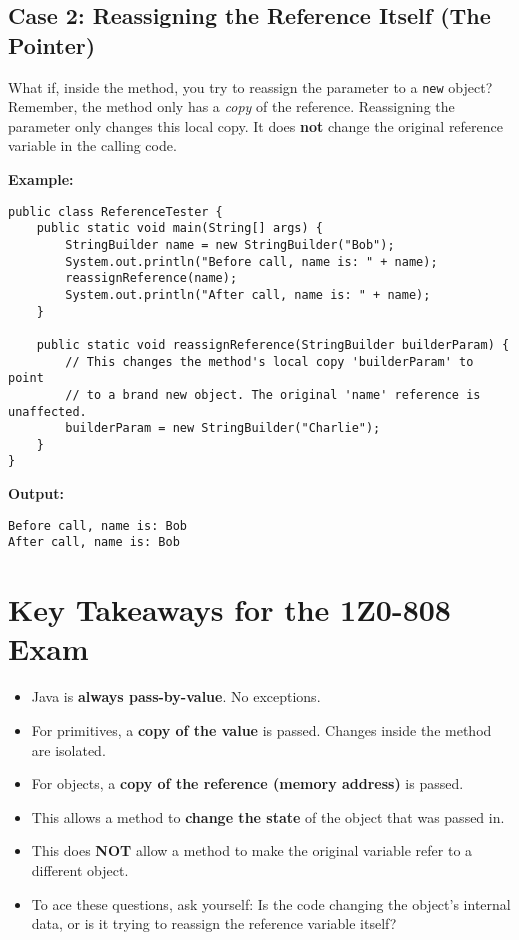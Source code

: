 \documentclass[12pt]{article}
\begin{document}
\begin{enumerate}[label=(\arabic*)]
\subsection{Case 2: Reassigning the Reference Itself (The Pointer)}
What if, inside the method, you try to reassign the parameter to a \texttt{new} object? Remember, the method only has a \textit{copy} of the reference. Reassigning the parameter only changes this local copy. It does \textbf{not} change the original reference variable in the calling code.

\textbf{Example:}
\begin{verbatim}
public class ReferenceTester {
    public static void main(String[] args) {
        StringBuilder name = new StringBuilder("Bob");
        System.out.println("Before call, name is: " + name);
        reassignReference(name);
        System.out.println("After call, name is: " + name);
    }

    public static void reassignReference(StringBuilder builderParam) {
        // This changes the method's local copy 'builderParam' to point
        // to a brand new object. The original 'name' reference is unaffected.
        builderParam = new StringBuilder("Charlie");
    }
}
\end{verbatim}
\textbf{Output:}
\begin{verbatim}
Before call, name is: Bob
After call, name is: Bob
\end{verbatim}

\section*{Key Takeaways for the 1Z0-808 Exam}
\begin{itemize}
    \item Java is \textbf{always pass-by-value}. No exceptions.
    \item For primitives, a \textbf{copy of the value} is passed. Changes inside the method are isolated.
    \item For objects, a \textbf{copy of the reference (memory address)} is passed.
    \item This allows a method to \textbf{change the state} of the object that was passed in.
    \item This does \textbf{NOT} allow a method to make the original variable refer to a different object.
    \item To ace these questions, ask yourself: Is the code changing the object's internal data, or is it trying to reassign the reference variable itself?
\end{itemize}
\end{enumerate}
\end{document}
